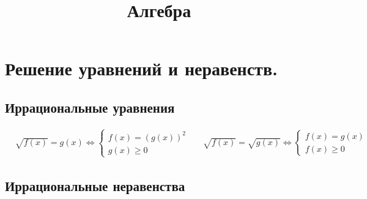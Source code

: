 \documentclass[12pt]{article}
\title{\textbf{Алгебра}}\date{}\author{}
\theoremstyle{definition}
\begin{document}
\maketitle
\tableofcontents
\label{toc}
\newpage

\section{Решение уравнений и неравенств.}

\subsection{Иррациональные уравнения}

\begin{align*}
&\sqrt{f(x)}=g(x)\Longleftrightarrow 
    \begin{cases}
        f(x)=(g(x))^2\\
        g(x)\geq0
    \end{cases} & &\sqrt{f(x)}=\sqrt{g(x)}\Longleftrightarrow
    \begin{cases}
        f(x)= g(x)\\
        f(x)\geq 0
    \end{cases}
\end{align*}

\subsection{Иррациональные неравенства}
\end{document}
